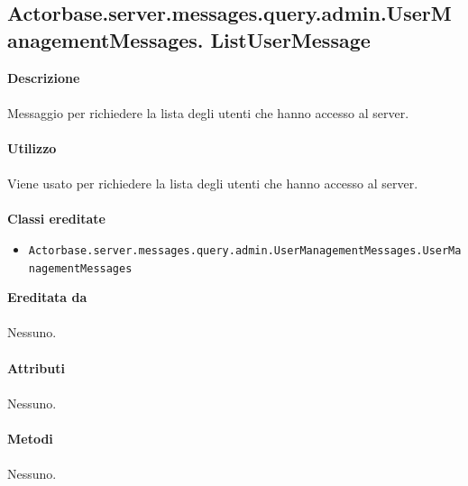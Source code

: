 \documentclass[a4paper]{article}
\begin{document}
	\subsection{Actorbase.server.messages.query.admin.UserManagementMessages.
	\newline ListUserMessage}
		\textbf{Descrizione}
			\\ \\
			Messaggio per richiedere la lista degli utenti che hanno accesso al server.
			\\ \\
		\textbf{Utilizzo}
			\\ \\
			Viene usato per richiedere la lista degli utenti che hanno accesso al server.
			\\ \\
		\textbf{Classi ereditate}
			\begin{itemize}
				\item \texttt{Actorbase.server.messages.query.admin.UserManagementMessages.UserManagementMessages}
			\end{itemize}
		\textbf{Ereditata da}
			\\ \\
			Nessuno.
			\\ \\
		\textbf{Attributi}
			\\ \\
			Nessuno.
			\\ \\
		\textbf{Metodi}
			\\ \\
			Nessuno.
			
\end{document}
